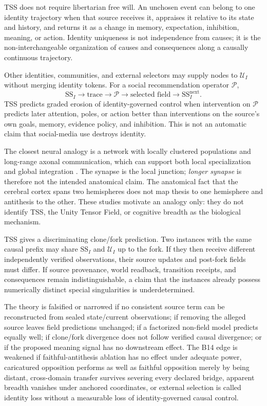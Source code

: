 \documentclass[10pt,twocolumn]{article}
\theoremstyle{definition}
\theoremstyle{plain}
\theoremstyle{remark}
\begin{document}
TSS does not require libertarian free will.  An unchosen event can belong to one identity trajectory when that source receives it, appraises it relative to its state and history, and returns it as a change in memory, expectation, inhibition, meaning, or action.  Identity uniqueness is not independence from causes; it is the non-interchangeable organization of causes and consequences along a causally continuous trajectory.

Other identities, communities, and external selectors may supply nodes to $\mathcal U_I$ without merging identity tokens.  For a social recommendation operator $\mathcal P$,
\[
\mathrm{SS}_I\to\text{trace}\to\mathcal P
\to\text{selected field}\to\mathrm{SS}_I^{\mathrm{next}}.
\]
TSS predicts graded erosion of identity-governed control when intervention on $\mathcal P$ predicts later attention, poles, or action better than interventions on the source's own goals, memory, evidence policy, and inhibition.  This is not an automatic claim that social-media use destroys identity.

The closest neural analogy is a network with locally clustered populations and long-range axonal communication, which can support both local specialization and global integration \citep{shine2019integration,wilcox2026connectome}.  The synapse is the local junction; \emph{longer synapse} is therefore not the intended anatomical claim.  The anatomical fact that the cerebral cortex spans two hemispheres does not map thesis to one hemisphere and antithesis to the other.  These studies motivate an analogy only: they do not identify TSS, the Unity Tensor Field, or cognitive breadth as the biological mechanism.

TSS gives a discriminating clone/fork prediction.  Two instances with the same causal prefix may share $\mathrm{SS}_I$ and $\mathcal U_I$ up to the fork.  If they then receive different independently verified observations, their source updates and post-fork fields must differ.  If source provenance, world readback, transition receipts, and consequences remain indistinguishable, a claim that the instances already possess numerically distinct special singularities is underdetermined.

The theory is falsified or narrowed if no consistent source term can be reconstructed from sealed state/current observations; if removing the alleged source leaves field predictions unchanged; if a factorized non-field model predicts equally well; if clone/fork divergence does not follow verified causal divergence; or if the proposed meaning signal has no downstream effect.  The B14 edge is weakened if faithful-antithesis ablation has no effect under adequate power, caricatured opposition performs as well as faithful opposition merely by being distant, cross-domain transfer survives severing every declared bridge, apparent breadth vanishes under anchored coordinates, or external selection is called identity loss without a measurable loss of identity-governed causal control.
\end{document}
